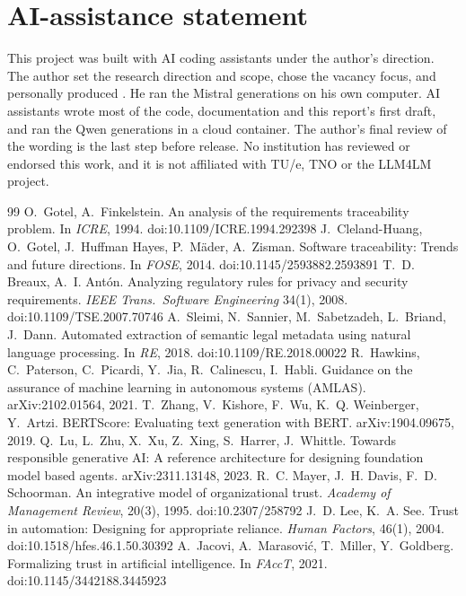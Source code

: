 \documentclass[10pt,twocolumn]{article}
\begin{document}
\section*{AI-assistance statement}
This project was built with AI coding assistants under the author's direction. The author set the research direction and scope, chose the vacancy focus, and personally produced . He ran the Mistral generations on his own computer. AI assistants wrote most of the code, documentation and this report's first draft, and ran the Qwen generations in a cloud container. The author's final review of the wording is the last step before release. No institution has reviewed or endorsed this work, and it is not affiliated with TU/e, TNO or the LLM4LM project.

\begin{thebibliography}{99}\small
{} O.~Gotel, A.~Finkelstein. An analysis of the requirements traceability problem. In \emph{ICRE}, 1994. doi:10.1109/ICRE.1994.292398
 J.~Cleland-Huang, O.~Gotel, J.~Huffman Hayes, P.~M\"ader, A.~Zisman. Software traceability: Trends and future directions. In \emph{FOSE}, 2014. doi:10.1145/2593882.2593891
 T.~D. Breaux, A.~I. Ant\'on. Analyzing regulatory rules for privacy and security requirements. \emph{IEEE Trans.\ Software Engineering} 34(1), 2008. doi:10.1109/TSE.2007.70746
 A.~Sleimi, N.~Sannier, M.~Sabetzadeh, L.~Briand, J.~Dann. Automated extraction of semantic legal metadata using natural language processing. In \emph{RE}, 2018. doi:10.1109/RE.2018.00022
 R.~Hawkins, C.~Paterson, C.~Picardi, Y.~Jia, R.~Calinescu, I.~Habli. Guidance on the assurance of machine learning in autonomous systems (AMLAS). arXiv:2102.01564, 2021.
 T.~Zhang, V.~Kishore, F.~Wu, K.~Q. Weinberger, Y.~Artzi. BERTScore: Evaluating text generation with BERT. arXiv:1904.09675, 2019.
 Q.~Lu, L.~Zhu, X.~Xu, Z.~Xing, S.~Harrer, J.~Whittle. Towards responsible generative AI: A reference architecture for designing foundation model based agents. arXiv:2311.13148, 2023.
 R.~C. Mayer, J.~H. Davis, F.~D. Schoorman. An integrative model of organizational trust. \emph{Academy of Management Review}, 20(3), 1995. doi:10.2307/258792
 J.~D. Lee, K.~A. See. Trust in automation: Designing for appropriate reliance. \emph{Human Factors}, 46(1), 2004. doi:10.1518/hfes.46.1.50.30392
 A.~Jacovi, A.~Marasovi\'c, T.~Miller, Y.~Goldberg. Formalizing trust in artificial intelligence. In \emph{FAccT}, 2021. doi:10.1145/3442188.3445923

\end{thebibliography}
\end{document}
